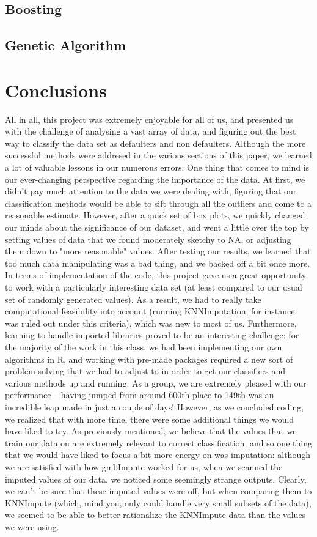 \documentclass[11pt, oneside]{article}   	%
\begin{document}
	\subsection{Boosting}
	\subsection{Genetic Algorithm}
\section{Conclusions}
	All in all, this project was extremely enjoyable for all of us, and presented us with the challenge of analysing a vast array of data, and figuring out the best way to classify the data set as defaulters and non defaulters. Although the more successful methods were addresed in the various sections of this paper, we learned a lot of valuable lessons in our numerous errors.
	One thing that comes to mind is our ever-changing perspective regarding the importance of the data. At first, we didn't pay much attention to the data we were dealing with, figuring that our classification methods would be able to sift through all the outliers and come to a reasonable estimate. However, after a quick set of box plots, we quickly changed our minds about the significance of our dataset, and went a little over the top by setting values of data that we found moderately sketchy to NA, or adjusting them down to "more reasonable" values. After testing our results, we learned that too much data manipulating was a bad thing, and we backed off a bit once more.
	In terms of implementation of the code, this project gave us a great opportunity to work with a particularly interesting data set (at least compared to our usual set of randomly generated values). As a result, we had to really take computational feasibility into account (running KNNImputation, for instance, was ruled out under this criteria), which was new to most of us. Furthermore, learning to handle imported libraries proved to be an interesting challenge: for the majority of the work in this class, we had been implementing our own algorithms in R, and working with pre-made packages required a new sort of problem solving that we had to adjust to in order to get our classifiers and various methods up and running.
	As a group, we are extremely pleased with our performance -- having jumped from around 600th place to 149th was an incredible leap made in just a couple of days! However, as we concluded coding, we realized that with more time, there were some additional things we would have liked to try. As previously mentioned, we believe that the values that we train our data on are extremely relevant to correct classification, and so one thing that we would have liked to focus a bit more energy on was imputation: although we are satisfied with how gmbImpute worked for us, when we scanned the imputed values of our data, we noticed some seemingly strange outputs. Clearly, we can't be sure that these imputed values were off, but when comparing them to KNNImpute (which, mind you, only could handle very small subsets of the data), we seemed to be able to better rationalize the KNNImpute data than the values we were using. 
\end{document}
